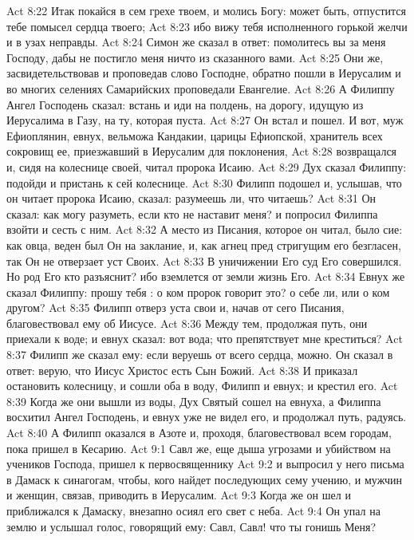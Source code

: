 \vs Act 8:22 Итак покайся в сем грехе твоем, и молись Богу: может быть, отпустится тебе помысел сердца твоего;
\vs Act 8:23 ибо вижу тебя исполненного горькой желчи и в узах неправды.
\vs Act 8:24 Симон же сказал в ответ: помолитесь вы за меня Господу, дабы не постигло меня ничто из сказанного вами.
\vs Act 8:25 Они же, засвидетельствовав и проповедав слово Господне, обратно пошли в Иерусалим и во многих селениях Самарийских проповедали Евангелие.
\rsbpar\vs Act 8:26 А Филиппу Ангел Господень сказал: встань и иди на полдень, на дорогу, идущую из Иерусалима в Газу, на ту, которая пуста.
\vs Act 8:27 Он встал и пошел. И вот, муж Ефиоплянин, евнух, вельможа Кандакии, царицы Ефиопской, хранитель всех сокровищ ее, приезжавший в Иерусалим для поклонения,
\vs Act 8:28 возвращался и, сидя на колеснице своей, читал пророка Исаию.
\vs Act 8:29 Дух сказал Филиппу: подойди и пристань к сей колеснице.
\vs Act 8:30 Филипп подошел и, услышав, что он читает пророка Исаию, сказал: разумеешь ли, что читаешь?
\vs Act 8:31 Он сказал: как могу разуметь, если кто не наставит меня? и попросил Филиппа взойти и сесть с ним.
\vs Act 8:32 А место из Писания, которое он читал, было сие: как овца, веден был Он на заклание, и, как агнец пред стригущим его безгласен, так Он не отверзает уст Своих.
\vs Act 8:33 В уничижении Его суд Его совершился. Но род Его кто разъяснит? ибо вземлется от земли жизнь Его.
\vs Act 8:34 Евнух же сказал Филиппу: прошу тебя : о ком пророк говорит это? о себе ли, или о ком другом?
\vs Act 8:35 Филипп отверз уста свои и, начав от сего Писания, благовествовал ему об Иисусе.
\vs Act 8:36 Между тем, продолжая путь, они приехали к воде; и евнух сказал: вот вода; что препятствует мне креститься?
\vs Act 8:37 Филипп же сказал ему: если веруешь от всего сердца, можно. Он сказал в ответ: верую, что Иисус Христос есть Сын Божий.
\vs Act 8:38 И приказал остановить колесницу, и сошли оба в воду, Филипп и евнух; и крестил его.
\vs Act 8:39 Когда же они вышли из воды, Дух Святый сошел на евнуха, а Филиппа восхитил Ангел Господень, и евнух уже не видел его, и продолжал путь, радуясь.
\vs Act 8:40 А Филипп оказался в Азоте и, проходя, благовествовал всем городам, пока пришел в Кесарию.
\vs Act 9:1 Савл же, еще дыша угрозами и убийством на учеников Господа, пришел к первосвященнику
\vs Act 9:2 и выпросил у него письма в Дамаск к синагогам, чтобы, кого найдет последующих сему учению, и мужчин и женщин, связав, приводить в Иерусалим.
\rsbpar\vs Act 9:3 Когда же он шел и приближался к Дамаску, внезапно осиял его свет с неба.
\vs Act 9:4 Он упал на землю и услышал голос, говорящий ему: Савл, Савл! что ты гонишь Меня?
